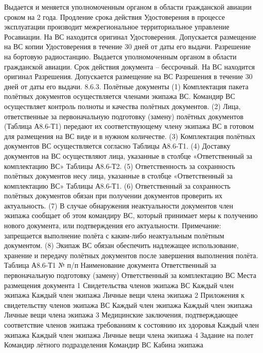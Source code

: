 Выдается и меняется уполномоченным органом в области гражданской авиации сроком на 2 года.
Продление срока действия Удостоверения в процессе эксплуатации производит межрегиональное территориальное управление Росавиации.
На ВС находится оригинал Удостоверения. Допускается размещение на ВС копии Удостоверения в течение 30 дней от даты его выдачи.
Разрешение на бортовую радиостанцию.
Выдается уполномоченным органом в области гражданской авиации. Срок действия документа – бессрочный. 
На ВС находится оригинал Разрешения. Допускается размещение на ВС Разрешения в течение 30 дней от даты его выдачи.
8.6.3. Полётные документы
(1)	Комплектация пакета полётных документов осуществляется членами экипажа ВС. Командир ВС осуществляет контроль полноты и качества полётных документов. 
(2)	Лица, ответственные за первоначальную подготовку (замену) полётных документов (Таблица А8.6-Т1) передают их соответствующему члену экипажа ВС в готовом для размещения на ВС виде и в нужном количестве. 
(3)	Комплектация полётных документов ВС осуществляется согласно Таблицы А8.6-Т1. 
(4)	Доставку документов на ВС осуществляют лица, указанные в столбце «Ответственный за комплектацию ВС» Таблицы А8.6-Т2.
(5)	Ответственность за сохранность полётных документов несу лица, указанные в столбце «Ответственный за комплектацию ВС» Таблицы А8.6-Т1.
(6)	Ответственный за сохранность полётных документов обязан при получении документов проверить их актуальность.
(7)	В случае обнаружения неактуальности документов член экипажа сообщает об этом командиру ВС, который принимает меры к получению нового документа, или подтверждения его актуальности. 
Примечание: запрещается выполнение полёта с каким-либо неактуальным полётным документом.
(8)	Экипаж ВС обязан обеспечить надлежащее использование, хранение и передачу полётных документов после завершения выполнения полёта. 
                                                                                                                                                 Таблица А8.6-Т1
№
п/п	Наименование документа	Ответственный за первоначальную подготовку (замену)	Ответственный за комплектацию ВС	Места размещения документа
1	Свидетельства членов экипажа ВС	Каждый член экипажа	Каждый член экипажа	Личные вещи члена экипажа
2	Приложения к свидетельству членов экипажа ВС	Каждый член экипажа	Каждый член экипажа	Личные вещи члена экипажа
3	Медицинские заключения, подтверждающее соответствие членов экипажа требованиям к состоянию их здоровья	Каждый член экипажа	Каждый член экипажа	Личные вещи члена экипажа
4	Задание на полет	Командир лётного подразделения	Командир ВС	Кабина экипажа
